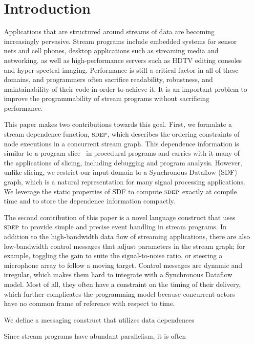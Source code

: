 \section{Introduction}

Applications that are structured around streams of data are becoming
increasingly pervasive.  Stream programs include embedded systems for
sensor nets and cell phones, desktop applications such as streaming
media and networking, as well as high-performance servers such as HDTV
editing consoles and hyper-spectral imaging.  Performance is still a
critical factor in all of these domains, and programmers often
sacrifice readability, robustness, and maintainability of their code
in order to achieve it.  It is an important problem to improve the
programmability of stream programs without sacrificing performance.

This paper makes two contributions towards this goal.  First, we
formulate a stream dependence function, $\textsc{sdep}$, which describes the
ordering constraints of node executions in a concurrent stream graph.
This dependence information is similar to a program
slice~\cite{tip95slice,hrb88pdg} in procedural programs and carries
with it many of the applications of slicing, including debugging and
program analysis.  However, unlike slicing, we restrict our input
domain to a Synchronous Dataflow (SDF) ~\cite{LM87-i} graph, which is
a natural representation for many signal processing applications.  We
leverage the static properties of SDF to compute $\textsc{sdep}$ exactly at
compile time and to store the dependence information compactly.

The second contribution of this paper is a novel language construct
that uses $\textsc{sdep}$ to provide simple and precise event handling in
stream programs.  In addition to the high-bandwidth data flow of
streaming applications, there are also low-bandwidth control messages
that adjust parameters in the stream graph; for example, toggling the
gain to suite the signal-to-noise ratio, or steering a microphone
array to follow a moving target.  Control messages are dynamic and
irregular, which makes them hard to integrate with a Synchronous
Dataflow model.  Most of all, they often have a constraint on the
timing of their delivery, which further complicates the programming
model because concurrent actors have no common frame of reference with
respect to time.

We define a messaging construct that utilizes data dependences 


Since stream programs have abundant parallelism, it is
often 

